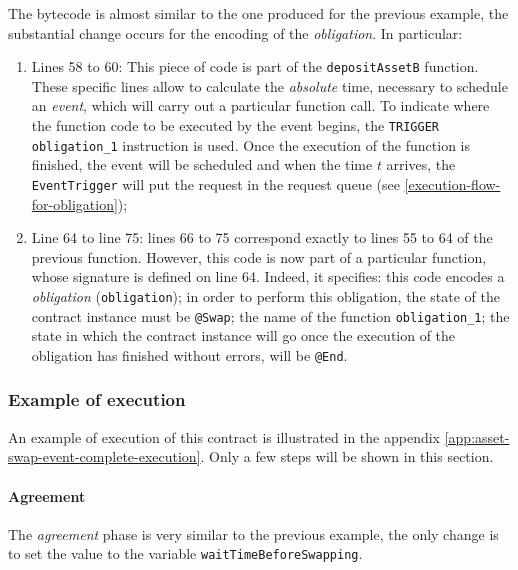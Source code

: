 The bytecode is almost similar to the one produced for the previous example, the substantial change 
occurs for the encoding of the \textit{obligation}. In particular:
\begin{enumerate}
  \item Lines 58 to 60: This piece of code is part of the \verb|depositAssetB| function. These specific 
  lines allow to calculate the \textit{absolute} time, necessary to schedule an \textit{event}, which will 
  carry out a particular function call. To indicate where the function code to be executed by the event 
  begins, the \verb|TRIGGER obligation_1| instruction is used. Once the execution of the function is 
  finished, the event will be scheduled and when the time $t$ arrives, the \verb|EventTrigger| will put 
  the request in the request queue (see \ref{execution-flow-for-obligation});
  \item Line 64 to line 75: lines 66 to 75 correspond exactly to lines 55 to 64 of the previous function. 
  However, this code is now part of a particular function, whose signature is defined on line 64. Indeed, 
  it specifies: this code encodes a \textit{obligation} (\verb|obligation|); in order to perform this 
  obligation, the state of the contract instance must be \verb|@Swap|; the name of the function 
  \verb|obligation_1|; the state in which the contract instance will go once the execution of the 
  obligation has finished without errors, will be \verb|@End|.
\end{enumerate}

\subsubsection{Example of execution}

An example of execution of this contract is illustrated in the appendix 
\ref{app:asset-swap-event-complete-execution}. Only a few steps will be shown in this section.

\paragraph{Agreement}

The \textit{agreement} phase is very similar to the previous example, the only change is to set the value 
to the variable \verb|waitTimeBeforeSwapping|.

